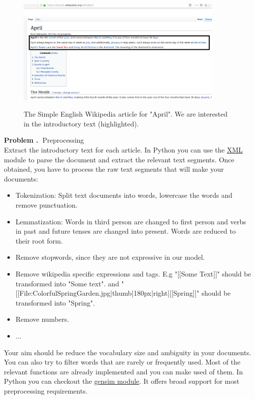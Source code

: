 \documentclass[10pt]{article}
\newcounter{problemCounter}
\newenvironment{problem}[1]
{
	\vspace{0.5cm}
	\refstepcounter{problemCounter}\label{#1}
	\noindent \textbf{Problem \theproblemCounter.$\;$} 
}{}
\begin{document}
\begin{figure}
	\includegraphics[width=0.9\textwidth]{article_intro.png}
	\label{fig:article_intro}
	\caption{The Simple English Wikipedia article for "April". We are interested in the introductory text (highlighted).}
\end{figure}

\begin{problem}
	PPreprocessing \\
	Extract the introductory text for each article. In Python you can use the \href{https://docs.python.org/3.7/library/xml.etree.elementtree.html}{XML} module to parse the document and extract the relevant text segments. Once obtained, you have to process the raw text segments that will make your documents:
	\begin{itemize}
		\item Tokenization: Split text documents into words, lowercase the words and remove punctuation.
		\item Lemmatization: Words in third person are changed to first person and verbs in past and future tenses are changed into present. Words are reduced to their root form.
		\item Remove stopwords, since they are not expressive in our model.
		\item Remove wikipedia specific expressions and tags. E.g "[[Some Text]]" should be transformed into "Some text". and "[[File:ColorfulSpringGarden.jpg|thumb|180px|right|[[Spring]]" should be transformed into "Spring".
		\item Remove numbers.
		\item ...
	\end{itemize}
	Your aim should be reduce the vocabulary size and ambiguity in your documents.
	You can also try to filter words that are rarely or frequently used. Most of the relevant functions are already implemented and you can make used of them. In Python you can checkout the 
	\href{https://radimrehurek.com/gensim/parsing/preprocessing.html}{gensim module}. It offers broad support for most preprocessing requirements.
\end{problem}
\end{document}
